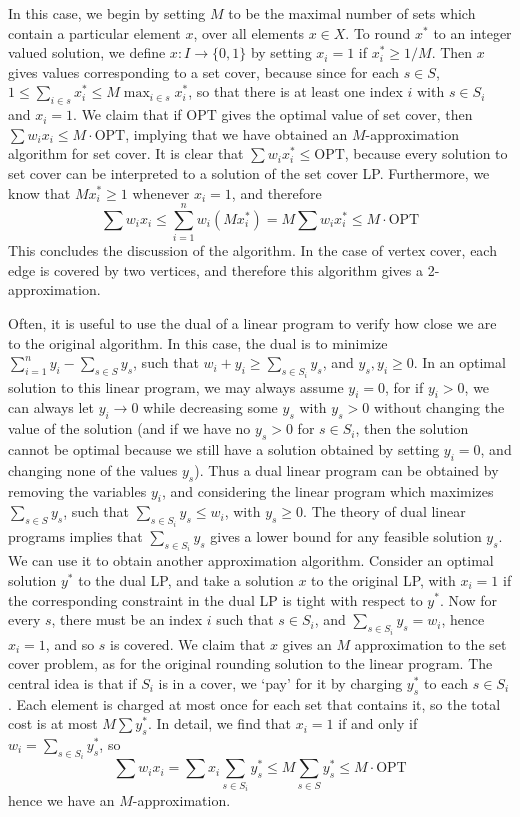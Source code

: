 In this case, we begin by setting $M$ to be the maximal number of sets which contain a particular element $x$, over all elements $x \in X$. To round $x^*$ to an integer valued solution, we define $x: I \to \{ 0, 1 \}$ by setting $x_i = 1$ if $x^*_i \geq 1/M$. Then $x$ gives values corresponding to a set cover, because since for each $s \in S$, $1 \leq \sum_{i \in s} x^*_i \leq M \max_{i \in s} x^*_i$, so that there is at least one index $i$ with $s \in S_i$ and $x_i = 1$. We claim that if $\text{OPT}$ gives the optimal value of set cover, then $\sum w_i x_i \leq M \cdot \text{OPT}$, implying that we have obtained an $M$-approximation algorithm for set cover. It is clear that $\sum w_i x^*_i \leq \text{OPT}$, because every solution to set cover can be interpreted to a solution of the set cover LP. Furthermore, we know that $M x^*_i \geq 1$ whenever $x_i = 1$, and therefore
%
\[ \sum w_i x_i \leq \sum_{i = 1}^n w_i (Mx^*_i) = M \sum w_i x^*_i \leq M \cdot \text{OPT} \]
%
This concludes the discussion of the algorithm. In the case of vertex cover, each edge is covered by two vertices, and therefore this algorithm gives a 2-approximation.

Often, it is useful to use the dual of a linear program to verify how close we are to the original algorithm. In this case, the dual is to minimize $\sum_{i = 1}^n y_i - \sum_{s \in S} y_s$, such that $w_i + y_i \geq \sum_{s \in S_i} y_s$, and $y_s, y_i \geq 0$. In an optimal solution to this linear program, we may always assume $y_i = 0$, for if $y_i > 0$, we can always let $y_i \to 0$ while decreasing some $y_s$ with $y_s > 0$ without changing the value of the solution (and if we have no $y_s > 0$ for $s \in S_i$, then the solution cannot be optimal because we still have a solution obtained by setting $y_i = 0$, and changing none of the values $y_s$). Thus a dual linear program can be obtained by removing the variables $y_i$, and considering the linear program which maximizes $\sum_{s \in S} y_s$, such that $\sum_{s \in S_i} y_s \leq w_i$, with $y_s \geq 0$. The theory of dual linear programs implies that $\sum_{s \in S_i} y_s$ gives a lower bound for any feasible solution $y_s$. We can use it to obtain another approximation algorithm. Consider an optimal solution $y^*$ to the dual LP, and take a solution $x$ to the original LP, with $x_i = 1$ if the corresponding constraint in the dual LP is tight with respect to $y^*$. Now for every $s$, there must be an index $i$ such that $s \in S_i$, and $\sum_{s \in S_i} y_s = w_i$, hence $x_i = 1$, and so $s$ is covered. We claim that $x$ gives an $M$ approximation to the set cover problem, as for the original rounding solution to the linear program. The central idea is that if $S_i$ is in a cover, we `pay' for it by charging $y_s^*$ to each $s \in S_i$. Each element is charged at most once for each set that contains it, so the total cost is at most $M \sum y^*_s$. In detail, we find that $x_i = 1$ if and only if $w_i = \sum_{s \in S_i} y_s^*$, so
%
\[ \sum w_i x_i = \sum x_i \sum_{s \in S_i} y_s^* \leq M \sum_{s \in S} y_s^* \leq M \cdot \text{OPT} \]
%
hence we have an $M$-approximation.

